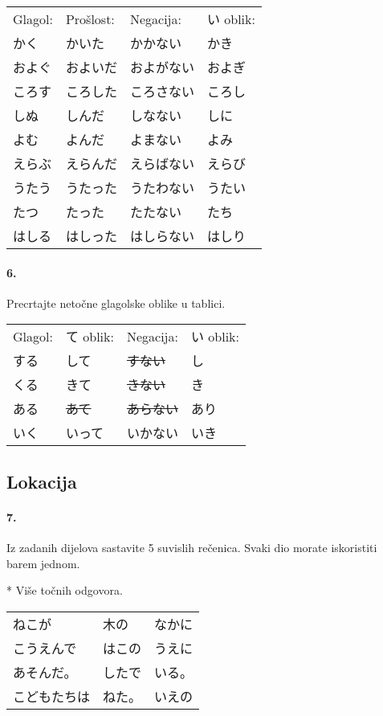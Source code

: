 \documentclass[12pt]{article}
\begin{document}
	\begin{tabularx}{\textwidth}{X X X X}
		Glagol:&Prošlost:&Negacija:&い oblik:\\
		かく&かいた&かかない&かき\\
		およぐ&およいだ&およがない&およぎ\\
		ころす&ころした&ころさない&ころし\\
		しぬ&しんだ&しなない&しに\\
		よむ&よんだ&よまない&よみ\\
		えらぶ&えらんだ&えらばない&えらび\\
		うたう&うたった&うたわない&うたい\\
		たつ&たった&たたない&たち\\
		はしる&はしった&はしらない&はしり\\
	\end{tabularx}
	
	\paragraph{6.} Precrtajte netočne glagolske oblike u tablici.
	
	\begin{tabularx}{\textwidth}{X X X X}
		Glagol:&て oblik:&Negacija:&い oblik:\\
		する&して&\sout{すない}&し\\
		くる&きて&\sout{きない}&き\\
		ある&\sout{あて}&\sout{あらない}&あり\\
		いく&いって&いかない&いき\\
	\end{tabularx}

	\subsection{Lokacija}
	
	\paragraph{7.} Iz zadanih dijelova sastavite 5 suvislih rečenica. Svaki dio morate iskoristiti barem jednom.
	
	* Više točnih odgovora.
	
	\begin{tabularx}{\textwidth}{X X X}
		ねこが&木の&なかに\\
		こうえんで&はこの&うえに\\
		あそんだ。&したで&いる。\\
		こどもたちは&ねた。&いえの\\
	\end{tabularx}
	
\end{document}
